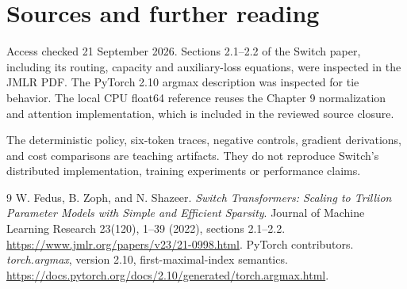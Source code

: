 \chapter*{Sources and further reading}
Access checked 21 September 2026. Sections 2.1--2.2 of the Switch paper,
including its routing, capacity and auxiliary-loss equations, were inspected
in the JMLR PDF. The PyTorch 2.10 argmax description was inspected for tie
behavior. The local CPU float64 reference reuses the Chapter 9 normalization
and attention implementation, which is included in the reviewed source closure.

The deterministic policy, six-token traces, negative controls, gradient
derivations, and cost comparisons are teaching artifacts. They do not
reproduce Switch's distributed implementation, training experiments or
performance claims.

\begingroup
\let\chapter\section
\begin{thebibliography}{9}
 W. Fedus, B. Zoph, and N. Shazeer.
\emph{Switch Transformers: Scaling to Trillion Parameter Models with Simple and Efficient Sparsity}.
Journal of Machine Learning Research 23(120), 1--39 (2022), sections 2.1--2.2.
\url{https://www.jmlr.org/papers/v23/21-0998.html}.
 PyTorch contributors. \emph{torch.argmax}, version 2.10,
first-maximal-index semantics.
\url{https://docs.pytorch.org/docs/2.10/generated/torch.argmax.html}.
\end{thebibliography}
\endgroup
